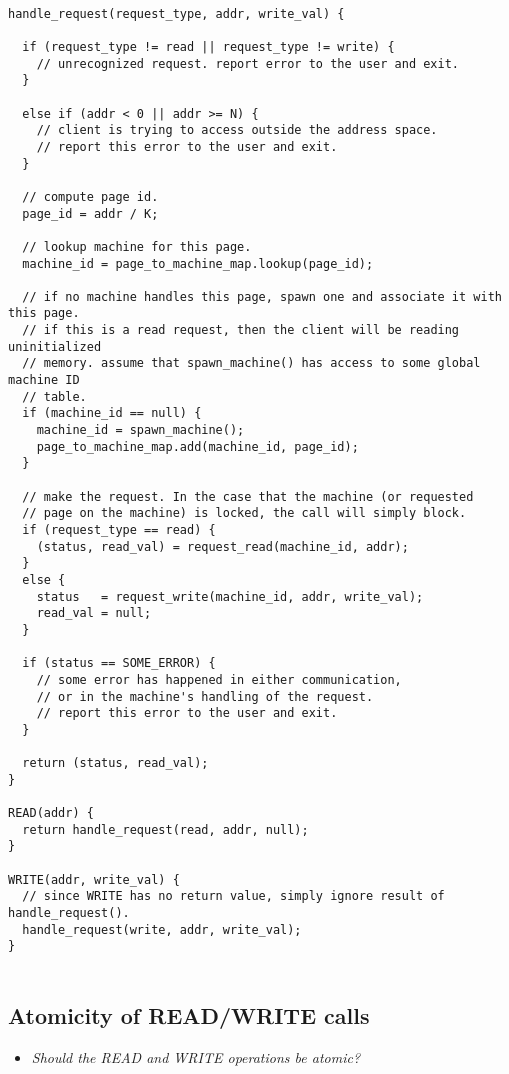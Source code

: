 \begin{verbatim}

handle_request(request_type, addr, write_val) { 

  if (request_type != read || request_type != write) {
    // unrecognized request. report error to the user and exit.
  }

  else if (addr < 0 || addr >= N) {
    // client is trying to access outside the address space.
    // report this error to the user and exit.
  }

  // compute page id.
  page_id = addr / K;

  // lookup machine for this page.
  machine_id = page_to_machine_map.lookup(page_id);

  // if no machine handles this page, spawn one and associate it with this page.
  // if this is a read request, then the client will be reading uninitialized 
  // memory. assume that spawn_machine() has access to some global machine ID
  // table.
  if (machine_id == null) {
    machine_id = spawn_machine();
    page_to_machine_map.add(machine_id, page_id);
  }

  // make the request. In the case that the machine (or requested
  // page on the machine) is locked, the call will simply block.
  if (request_type == read) {
    (status, read_val) = request_read(machine_id, addr);
  }
  else {
    status   = request_write(machine_id, addr, write_val);
    read_val = null;
  }

  if (status == SOME_ERROR) {
    // some error has happened in either communication,
    // or in the machine's handling of the request.
    // report this error to the user and exit.
  }

  return (status, read_val);
}

READ(addr) {
  return handle_request(read, addr, null);
}

WRITE(addr, write_val) {
  // since WRITE has no return value, simply ignore result of handle_request().
  handle_request(write, addr, write_val);
}


\end{verbatim}

\subsection{Atomicity of READ/WRITE calls}

\begin{itemize}
  \item \textit{Should the READ and WRITE operations be atomic?}
\end{itemize}

